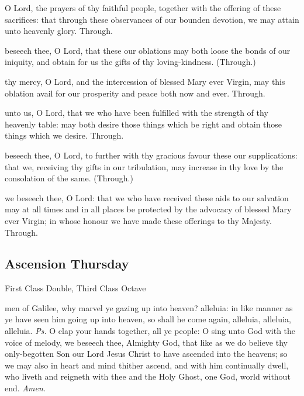 
\secret
{} O Lord, the prayers of thy faithful people, together with the offering of these sacrifices: that through these observances of our bounden devotion, we may attain unto heavenly glory. Through.

 beseech thee, O Lord, that these our oblations may both loose the bonds of our iniquity, and obtain for us the gifts of thy loving-kindness. (Through.)

 thy mercy, O Lord, and the intercession of blessed Mary ever Virgin, may this oblation avail for our prosperity and peace both now and ever. Through.


\postcommunion
{} unto us, O Lord, that we who have been fulfilled with the strength of thy heavenly table: may both desire those things which be right and obtain those things which we desire. Through.

 beseech thee, O Lord, to further with thy gracious favour these our supplications: that we, receiving thy gifts in our tribulation, may increase in thy love by the consolation of the same. (Through.)

 we beseech thee, O Lord: that we who have received these aids to our salvation may at all times and in all places be protected by the advocacy of blessed Mary ever Virgin; in whose honour we have made these offerings to thy Majesty. Through.


\subsection{Ascension Thursday}
\begin{inhead}
    {First Class Double, Third Class Octave}
\end{inhead}


\introit
{} men of Galilee, why marvel ye gazing up into heaven? alleluia: in like manner as ye have seen him going up into heaven, so shall he come again, alleluia, alleluia, alleluia. \textit{Ps.} O clap your hands together, all ye people: O sing unto God with the voice of melody,
\collect
{} we beseech thee, Almighty God, that like as we do believe thy only-begotten Son our Lord Jesus Christ to have ascended into the heavens; so we may also in heart and mind thither ascend, and with him continually dwell, who liveth and reigneth with thee and the Holy Ghost, one God, world without end. \textit{Amen.}

